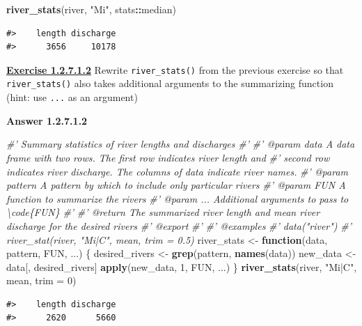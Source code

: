 \documentclass[
]{book}
\newenvironment{Shaded}{\begin{snugshade}}{\end{snugshade}}
\newcommand{\CommentTok}[1]{\textcolor[rgb]{0.56,0.35,0.01}{\textit{#1}}}
\newcommand{\ControlFlowTok}[1]{\textcolor[rgb]{0.13,0.29,0.53}{\textbf{#1}}}
\newcommand{\DataTypeTok}[1]{\textcolor[rgb]{0.13,0.29,0.53}{#1}}
\newcommand{\DecValTok}[1]{\textcolor[rgb]{0.00,0.00,0.81}{#1}}
\newcommand{\KeywordTok}[1]{\textcolor[rgb]{0.13,0.29,0.53}{\textbf{#1}}}
\newcommand{\NormalTok}[1]{#1}
\newcommand{\OperatorTok}[1]{\textcolor[rgb]{0.81,0.36,0.00}{\textbf{#1}}}
\newcommand{\StringTok}[1]{\textcolor[rgb]{0.31,0.60,0.02}{#1}}
\begin{document}
\begin{Shaded}
\begin{Highlighting}[]
\KeywordTok{river_stats}\NormalTok{(river, }\StringTok{"Mi"}\NormalTok{, stats}\OperatorTok{::}\NormalTok{median)}
\end{Highlighting}
\end{Shaded}

\begin{verbatim}
#>    length discharge 
#>      3656     10178
\end{verbatim}

\textbf{\protect\hyperlink{ex-set3}{Exercise 1.2.7.1.2}} Rewrite \texttt{river\_stats()} from the previous exercise so that \texttt{river\_stats()} also takes additional arguments to the summarizing function (hint: use \texttt{...} as an argument)

\textbf{Answer 1.2.7.1.2}

\begin{Shaded}
\begin{Highlighting}[]
\CommentTok{#' Summary statistics of river lengths and discharges}
\CommentTok{#'}
\CommentTok{#' @param data A data frame with two rows. The first row indicates river length and}
\CommentTok{#'   second row indicates river discharge. The columns of data indicate river names.}
\CommentTok{#' @param pattern A pattern by which to include only particular rivers}
\CommentTok{#' @param FUN A function to summarize the rivers}
\CommentTok{#' @param ... Additional arguments to pass to \textbackslash{}code\{FUN\}}
\CommentTok{#'}
\CommentTok{#' @return The summarized river length and mean river discharge for the desired rivers}
\CommentTok{#' @export}
\CommentTok{#'}
\CommentTok{#' @examples}
\CommentTok{#' data("river")}
\CommentTok{#' river_stat(river, "Mi|C", mean, trim = 0.5)}
\NormalTok{river_stats <-}\StringTok{ }\ControlFlowTok{function}\NormalTok{(data, pattern, FUN, ...) \{}
\NormalTok{  desired_rivers <-}\StringTok{ }\KeywordTok{grep}\NormalTok{(pattern, }\KeywordTok{names}\NormalTok{(data))}
\NormalTok{  new_data <-}\StringTok{ }\NormalTok{data[, desired_rivers]}
  \KeywordTok{apply}\NormalTok{(new_data, }\DecValTok{1}\NormalTok{, FUN, ...)}
\NormalTok{\}}
\KeywordTok{river_stats}\NormalTok{(river, }\StringTok{"Mi|C"}\NormalTok{, mean, }\DataTypeTok{trim =} \DecValTok{0}\NormalTok{)}
\end{Highlighting}
\end{Shaded}

\begin{verbatim}
#>    length discharge 
#>      2620      5660
\end{verbatim}
\end{document}
